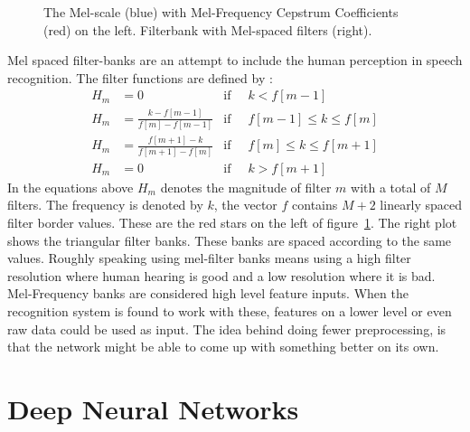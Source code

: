 \begin{figure}
\centering


\caption{The Mel-scale (blue) with Mel-Frequency Cepstrum Coefficients (red)  on the left. Filterbank with Mel-spaced filters (right).}
\label{fig:mel}
\end{figure}
Mel spaced filter-banks are an attempt to include the human perception in speech recognition. The filter functions are defined by \cite[page 317]{Huang2001}:
\begin{align}
H_m &= 0 									   &\text{if}\;\; & k < f[m-1] \\
H_m &= \frac{k      - f[m-1] }{f[m] - f[m-1]}  &\text{if}\;\; & f[m-1] \leq k \leq f[m] \\
H_m &= \frac{f[m+1] - k      }{f[m + 1] - f[m]}&\text{if}\;\; & f[m] \leq k \leq f[m+1] \\
H_m &= 0									   &\text{if}\;\; & k > f[m+1] 
\end{align} 
In the equations above $H_m$ denotes the magnitude of filter $m$ with a total of $M$ filters. The frequency is denoted by $k$, the vector $f$ contains $M+2$ linearly spaced filter border values. These are the red stars on the left of  figure~\ref{fig:mel}. The right plot shows the triangular filter banks. These banks are spaced according to the same values. Roughly speaking using mel-filter banks means using a high filter resolution where human hearing is good and a low resolution where it is bad. \\
Mel-Frequency banks are considered high level feature inputs. When the recognition system is found to work with these, features on a lower level or even raw data could be used as input. The idea behind doing fewer preprocessing, is that the network might be able to come up with something better on its own.

\section{Deep Neural Networks}
